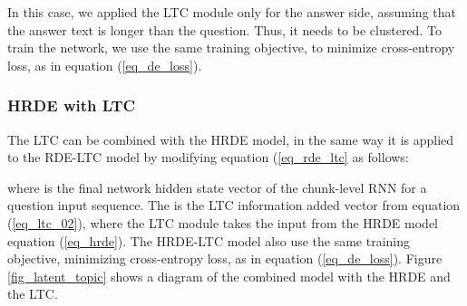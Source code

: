 \documentclass[11pt,a4paper]{article}
\begin{document}
In this case, we applied the LTC module only for the answer side, assuming that the answer text is longer than the question. Thus, it needs to be clustered. 
To train the network, we use the same training objective, to minimize cross-entropy loss, as in equation (\ref{eq_de_loss}).


\subsubsection{HRDE with LTC}
The LTC can be combined with the HRDE model, in the same way it is applied to the RDE-LTC model by modifying equation (\ref{eq_rde_ltc} as follows:

where   is the final network hidden state vector of the chunk-level RNN for a question input sequence. The  is the LTC information added vector from equation (\ref{eq_ltc_02}), where the LTC module takes the input  from the HRDE model equation (\ref{eq_hrde}).
The HRDE-LTC model also use  the  same training objective, minimizing cross-entropy loss, as in equation (\ref{eq_de_loss}).
Figure \ref{fig_latent_topic} shows a diagram of the combined model with the HRDE and the LTC.
\end{document}
